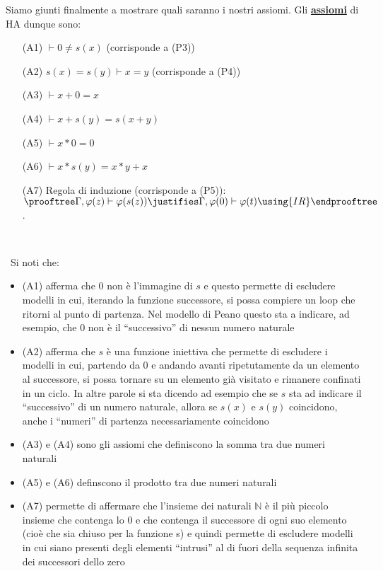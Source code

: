 \vspace{0.5cm}
Siamo giunti finalmente a mostrare quali saranno i nostri assiomi.
Gli \underline{\textbf{assiomi}} di HA dunque sono:
\begin{enumerate}
	\item[(A1)] $\vdash 0\neq s(x)$ (corrisponde a (P3))
	\item[(A2)] $s(x)=s(y)\vdash x=y$ (corrisponde a (P4))
	\item[(A3)] $\vdash x+0=x$
	\item[(A4)] $\vdash x+s(y)=s(x+y)$
	\item[(A5)] $\vdash x*0=0$
	\item[(A6)] $\vdash x*s(y)=x*y+x$
	\item[(A7)] Regola di induzione (corrisponde a (P5)):\newline\newline
	$\prooftree
  \Gamma, \varphi(z) \vdash \varphi(s(z))
   \justifies
 \Gamma, \varphi(0) \vdash \varphi(t)
 \using
 {IR}
\endprooftree$.
\end{enumerate}\par\ \par\
Si noti che:
\begin{itemize}
\item (A1) afferma che $0$ non \`e l'immagine di $s$ e questo permette di escludere modelli in cui, iterando la funzione successore, si possa compiere un loop che ritorni al punto di partenza. Nel modello di Peano questo sta a indicare, ad esempio, che $0$ non \`e il "`successivo"' di nessun numero naturale
\item (A2) afferma che $s$ \`e una funzione iniettiva che permette di escludere i modelli in cui, partendo da $0$ e andando avanti ripetutamente da un elemento al successore, si possa tornare su un elemento gi\`a visitato e rimanere confinati in un ciclo. In altre parole si sta dicendo ad esempio che se $s$ sta ad indicare il "`successivo"' di un numero naturale, allora se $s(x)$ e $s(y)$ coincidono, anche i "`numeri"' di partenza necessariamente coincidono
\item (A3) e (A4) sono gli assiomi che definiscono la somma tra due numeri naturali
\item (A5) e (A6) definscono il prodotto tra due numeri naturali
\item (A7) permette di affermare che l'insieme dei naturali $\mathbb {N}$ \`e il pi\`u piccolo insieme che contenga lo $0$ e che contenga il successore di ogni suo elemento (cio\`e che sia chiuso per la funzione s) e quindi permette di escludere modelli in cui siano presenti degli elementi "`intrusi"' al di fuori della sequenza infinita dei successori dello zero
\end{itemize}

